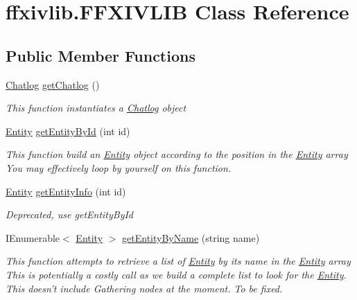 \hypertarget{classffxivlib_1_1_f_f_x_i_v_l_i_b}{\section{ffxivlib.\-F\-F\-X\-I\-V\-L\-I\-B Class Reference}
\label{classffxivlib_1_1_f_f_x_i_v_l_i_b}
}
\subsection*{Public Member Functions}
\begin{DoxyCompactItemize}
\item 
\hyperlink{classffxivlib_1_1_chatlog}{Chatlog} \hyperlink{classffxivlib_1_1_f_f_x_i_v_l_i_b_acb5cc13e23647bd93e9f550a7a6961d3}{get\-Chatlog} ()
\begin{DoxyCompactList}\small\item\em This function instantiates a \hyperlink{classffxivlib_1_1_chatlog}{Chatlog} object \end{DoxyCompactList}\item 
\hyperlink{classffxivlib_1_1_entity}{Entity} \hyperlink{classffxivlib_1_1_f_f_x_i_v_l_i_b_a494ffffe0d2b77aef3457e9eb8969a3b}{get\-Entity\-By\-Id} (int id)
\begin{DoxyCompactList}\small\item\em This function build an \hyperlink{classffxivlib_1_1_entity}{Entity} object according to the position in the \hyperlink{classffxivlib_1_1_entity}{Entity} array You may effectively loop by yourself on this function. \end{DoxyCompactList}\item 
\hyperlink{classffxivlib_1_1_entity}{Entity} \hyperlink{classffxivlib_1_1_f_f_x_i_v_l_i_b_a4632b29db89772dc247157184e99f684}{get\-Entity\-Info} (int id)
\begin{DoxyCompactList}\small\item\em Deprecated, use get\-Entity\-By\-Id \end{DoxyCompactList}\item 
I\-Enumerable$<$ \hyperlink{classffxivlib_1_1_entity}{Entity} $>$ \hyperlink{classffxivlib_1_1_f_f_x_i_v_l_i_b_ab88d3f8c698fc739a7afeb0f24a26a21}{get\-Entity\-By\-Name} (string name)
\begin{DoxyCompactList}\small\item\em This function attempts to retrieve a list of \hyperlink{classffxivlib_1_1_entity}{Entity} by its name in the \hyperlink{classffxivlib_1_1_entity}{Entity} array This is potentially a costly call as we build a complete list to look for the \hyperlink{classffxivlib_1_1_entity}{Entity}. This doesn't include Gathering nodes at the moment. To be fixed. \end{DoxyCompactList}\item 

\end{DoxyCompactItemize}
